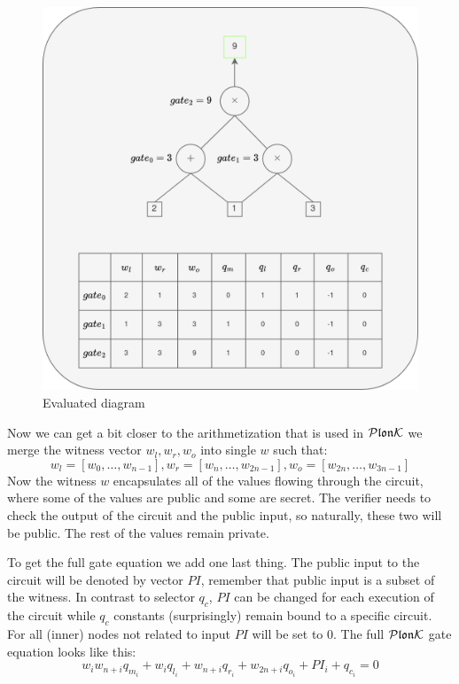 \begin{figure}[H]
    \centering
    \includegraphics[width=0.75\linewidth]{figures/arithmetization_evaluated.drawio.png}
    \caption{Evaluated diagram}
    \label{fig:evaluated-circuit}
\end{figure}


Now we can get a bit closer to the arithmetization that is used in $\mathcal{P}\mathfrak{lon}\mathcal{K}$ we merge the witness vector $w_l, w_r, w_o$ into single $w$ such that: $$w_l = [w_0, \dots, w_{n-1}], w_r = [w_n, \dots, w_{2n-1}], w_o = [w_{2n}, \dots, w_{3n-1}]$$ 
Now the witness $w$ encapsulates all of the values flowing through the circuit, where some of the values are public and some are secret. The verifier needs to check the output of the circuit and the public input, so naturally, these two will be public. The rest of the values remain private.

To get the full gate equation we add one last thing. The public input to the circuit will be denoted by vector $PI$, remember that public input is a subset of the witness. In contrast to selector $q_c$, $PI$ can be changed for each execution of the circuit while 
$q_c$ constants (surprisingly) remain bound to a specific circuit. For all (inner) nodes not related to input $PI$ will be set to 0. The full $\mathcal{P}\mathfrak{lon}\mathcal{K}$ gate equation looks like this:
\begin{equation}\label{gate-constraint}
    w_{i}w_{n+i}q_{m_i} + w_{i}q_{l_i} + w_{n+i}q_{r_i} + w_{2n+i}q_{o_i} + PI_i + q_{c_i} = 0 
\end{equation}

